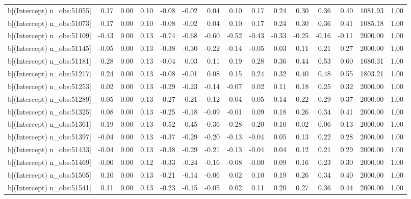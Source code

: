 \begin{table}[ht]
\begin{tabular}{rrrrrrrrrrrrrrr}
  b[(Intercept) n\_obs:51055] & 0.17 & 0.00 & 0.10 & -0.08 & -0.02 & 0.04 & 0.10 & 0.17 & 0.24 & 0.30 & 0.36 & 0.40 & 1081.93 & 1.00 \\ 
  b[(Intercept) n\_obs:51073] & 0.17 & 0.00 & 0.10 & -0.08 & -0.02 & 0.04 & 0.10 & 0.17 & 0.24 & 0.30 & 0.36 & 0.41 & 1085.18 & 1.00 \\ 
  b[(Intercept) n\_obs:51109] & -0.43 & 0.00 & 0.13 & -0.74 & -0.68 & -0.60 & -0.52 & -0.43 & -0.33 & -0.25 & -0.16 & -0.11 & 2000.00 & 1.00 \\ 
  b[(Intercept) n\_obs:51145] & -0.05 & 0.00 & 0.13 & -0.38 & -0.30 & -0.22 & -0.14 & -0.05 & 0.03 & 0.11 & 0.21 & 0.27 & 2000.00 & 1.00 \\ 
  b[(Intercept) n\_obs:51181] & 0.28 & 0.00 & 0.13 & -0.04 & 0.03 & 0.11 & 0.19 & 0.28 & 0.36 & 0.44 & 0.53 & 0.60 & 1680.31 & 1.00 \\ 
  b[(Intercept) n\_obs:51217] & 0.24 & 0.00 & 0.13 & -0.08 & -0.01 & 0.08 & 0.15 & 0.24 & 0.32 & 0.40 & 0.48 & 0.55 & 1803.21 & 1.00 \\ 
  b[(Intercept) n\_obs:51253] & 0.02 & 0.00 & 0.13 & -0.29 & -0.23 & -0.14 & -0.07 & 0.02 & 0.11 & 0.18 & 0.25 & 0.32 & 2000.00 & 1.00 \\ 
  b[(Intercept) n\_obs:51289] & 0.05 & 0.00 & 0.13 & -0.27 & -0.21 & -0.12 & -0.04 & 0.05 & 0.14 & 0.22 & 0.29 & 0.37 & 2000.00 & 1.00 \\ 
  b[(Intercept) n\_obs:51325] & 0.08 & 0.00 & 0.13 & -0.25 & -0.18 & -0.09 & -0.01 & 0.09 & 0.18 & 0.26 & 0.34 & 0.41 & 2000.00 & 1.00 \\ 
  b[(Intercept) n\_obs:51361] & -0.19 & 0.00 & 0.13 & -0.52 & -0.45 & -0.36 & -0.28 & -0.20 & -0.10 & -0.02 & 0.06 & 0.13 & 2000.00 & 1.00 \\ 
  b[(Intercept) n\_obs:51397] & -0.04 & 0.00 & 0.13 & -0.37 & -0.29 & -0.20 & -0.13 & -0.04 & 0.05 & 0.13 & 0.22 & 0.28 & 2000.00 & 1.00 \\ 
  b[(Intercept) n\_obs:51433] & -0.04 & 0.00 & 0.13 & -0.38 & -0.29 & -0.21 & -0.13 & -0.04 & 0.04 & 0.12 & 0.21 & 0.29 & 2000.00 & 1.00 \\ 
  b[(Intercept) n\_obs:51469] & -0.00 & 0.00 & 0.12 & -0.33 & -0.24 & -0.16 & -0.08 & -0.00 & 0.09 & 0.16 & 0.23 & 0.30 & 2000.00 & 1.00 \\ 
  b[(Intercept) n\_obs:51505] & 0.10 & 0.00 & 0.13 & -0.21 & -0.14 & -0.06 & 0.02 & 0.10 & 0.19 & 0.26 & 0.34 & 0.40 & 2000.00 & 1.00 \\ 
  b[(Intercept) n\_obs:51541] & 0.11 & 0.00 & 0.13 & -0.23 & -0.15 & -0.05 & 0.02 & 0.11 & 0.20 & 0.27 & 0.36 & 0.44 & 2000.00 & 1.00 \\ 

\end{tabular}
\end{table}
